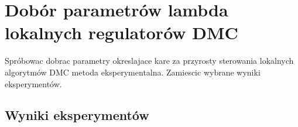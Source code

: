 \section{Dobór parametrów lambda lokalnych regulatorów DMC}
\label{lab:zad6}

Spróbowac dobrac parametry okreslajace kare za przyrosty sterowania lokalnych algorytmów
DMC metoda eksperymentalna. Zamiescic wybrane wyniki eksperymentów.

%    


\subsection{Wyniki eksperymentów}
\label{lab:zad6:eksperymenty}



\newpage

